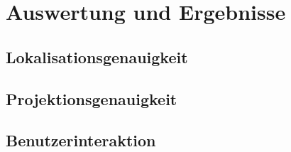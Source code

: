 \chapter{Auswertung und Ergebnisse}

\section{Lokalisationsgenauigkeit}

\section{Projektionsgenauigkeit}

\section{Benutzerinteraktion}
